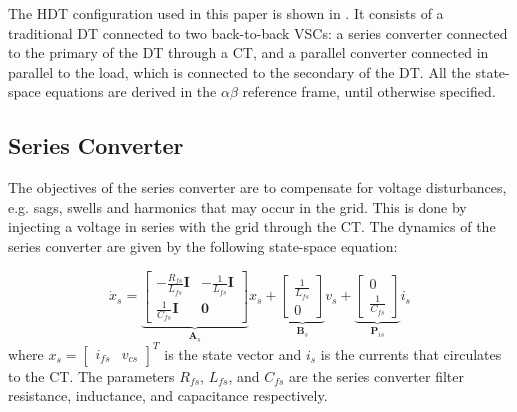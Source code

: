 The HDT configuration used in this paper is shown in . It consists of a traditional DT connected to two back-to-back VSCs: a series converter connected to the primary of the DT through a CT, and a parallel converter connected in parallel to the load, which is connected to the secondary of the DT. All the state-space equations are derived in the $\alpha\beta$ reference frame, until otherwise specified.

\subsection{Series Converter}
The objectives of the series converter are to compensate for voltage disturbances, e.g. sags, swells and harmonics that may occur in the grid. This is done by injecting a voltage in series with the grid through the CT. The dynamics of the series converter are given by the following state-space equation:

\begin{equation}
    \dot{x}_s =
    \underbrace{
    \begin{bmatrix}
        -\frac{R_{fs}}{L_{fs}} \mathbf{I} & -\frac{1}{L_{fs}} \mathbf{I} \\
        \frac{1}{C_{fs}} \mathbf{I} & \mathbf{0}
    \end{bmatrix}
    }_{\mathbf{A}_s}
    x_s +
    \underbrace{
    \begin{bmatrix}
        \frac{1}{L_{fs}}\\
        0
    \end{bmatrix}
    }_{\mathbf{B}_s}
    v_s +
    \underbrace{
    \begin{bmatrix}
        0 \\
        \frac{1}{C_{fs}}
    \end{bmatrix}
    }_{\mathbf{P}_{is}}
    i_s \label{eq:SeriesConverter_Dynamics}
\end{equation}
where $x_s = \begin{bmatrix} i_{fs} & v_{cs} \end{bmatrix}^T$ is the state vector and $i_s$ is the currents that circulates to the CT. The parameters $R_{fs}$, $L_{fs}$, and $C_{fs}$ are the series converter filter resistance, inductance, and capacitance respectively.

